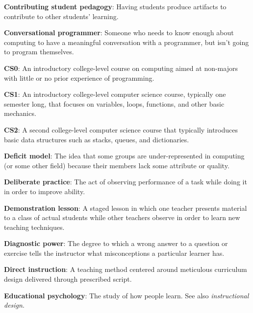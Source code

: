\textbf{\hypertarget{g:contributing-student}{Contributing student pedagogy}\label{g:contributing-student}}:
Having students produce artifacts to contribute to other students'
learning.

\textbf{\hypertarget{g:conversational-programmer}{Conversational programmer}\label{g:conversational-programmer}}:
Someone who needs to know enough about computing to have a meaningful
conversation with a programmer, but isn't going to program themselves.

\textbf{\hypertarget{g:cs0}{CS0}\label{g:cs0}}: An introductory college-level course on
computing aimed at non-majors with little or no prior experience of
programming.

\textbf{\hypertarget{g:cs1}{CS1}\label{g:cs1}}: An introductory college-level computer science
course, typically one semester long, that focuses on variables, loops,
functions, and other basic mechanics.

\textbf{\hypertarget{g:cs2}{CS2}\label{g:cs2}}: A second college-level computer science course
that typically introduces basic data structures such as stacks, queues,
and dictionaries.

\textbf{\hypertarget{g:deficit-model}{Deficit model}\label{g:deficit-model}}: The idea that some groups
are under-represented in computing (or some other field) because their
members lack some attribute or quality.

\textbf{\hypertarget{g:deliberate-practice}{Deliberate practice}\label{g:deliberate-practice}}: The act of
observing performance of a task while doing it in order to improve
ability.

\textbf{\hypertarget{g:demonstration-lesson}{Demonstration lesson}\label{g:demonstration-lesson}}: A staged
lesson in which one teacher presents material to a class of actual
students while other teachers observe in order to learn new teaching
techniques.

\textbf{\hypertarget{g:diagnostic-power}{Diagnostic power}\label{g:diagnostic-power}}: The degree to which a
wrong answer to a question or exercise tells the instructor what
misconceptions a particular learner has.

\textbf{\hypertarget{g:direct-instruction}{Direct instruction}\label{g:direct-instruction}}: A teaching method
centered around meticulous curriculum design delivered through
prescribed script.

\textbf{\hypertarget{g:educational-psychology}{Educational psychology}\label{g:educational-psychology}}: The study
of how people learn. See also \emph{instructional design}.

